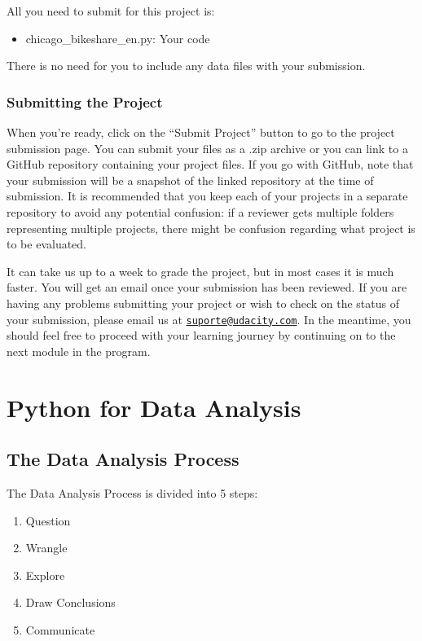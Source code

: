 \documentclass[]{book}
\providecommand{\tightlist}{%
  \setlength{\itemsep}{0pt}\setlength{\parskip}{0pt}}
\begin{document}
All you need to submit for this project is:

\begin{itemize}
\tightlist
\item
  chicago\_bikeshare\_en.py: Your code
\end{itemize}

There is no need for you to include any data files with your submission.

\subsection{Submitting the Project}\label{submitting-the-project}

When you're ready, click on the ``Submit Project'' button to go to the
project submission page. You can submit your files as a .zip archive or
you can link to a GitHub repository containing your project files. If
you go with GitHub, note that your submission will be a snapshot of the
linked repository at the time of submission. It is recommended that you
keep each of your projects in a separate repository to avoid any
potential confusion: if a reviewer gets multiple folders representing
multiple projects, there might be confusion regarding what project is to
be evaluated.

It can take us up to a week to grade the project, but in most cases it
is much faster. You will get an email once your submission has been
reviewed. If you are having any problems submitting your project or wish
to check on the status of your submission, please email us at
\href{mailto:suporte@udacity.com}{\nolinkurl{suporte@udacity.com}}. In
the meantime, you should feel free to proceed with your learning journey
by continuing on to the next module in the program.

\chapter{Python for Data Analysis}\label{python-for-data-analysis}

\section{The Data Analysis Process}\label{the-data-analysis-process}

The Data Analysis Process is divided into 5 steps:

\begin{enumerate}
\def\labelenumi{\arabic{enumi}.}
\tightlist
\item
  Question
\item
  Wrangle
\item
  Explore
\item
  Draw Conclusions
\item
  Communicate
\end{enumerate}
\end{document}
